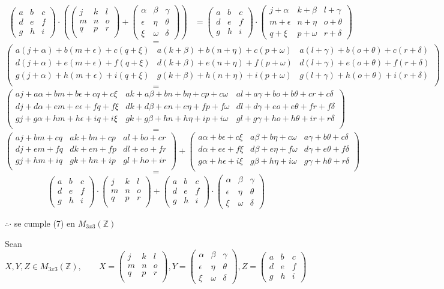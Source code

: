 \documentclass[letterpaper]{article}
\newcommand{\Nmat}{\begin{pmatrix}
		j & k & l\\
		m & n & o\\
		q & p & r\\
\end{pmatrix}}
\newcommand{\Pmat}{\begin{pmatrix}
		\alpha & \beta & \gamma\\
		\epsilon & \eta & \theta\\
		\xi & \omega & \delta
\end{pmatrix}}
\newcommand{\Mmat}{\begin{pmatrix}
		a & b & c\\
		d & e & f\\
		g & h & i
\end{pmatrix}}
\newcommand{\mtt}{M_{3x3}(\mathds{Z})}
\renewcommand{\*}{\cdot}
\theoremstyle{definition}
\begin{document}
\begin{align*}
\Mmat \* \left( \Nmat + \Pmat \right) &= \Mmat \* \begin{pmatrix}
j + \alpha & k + \beta & l + \gamma\\
m + \epsilon & n + \eta & o + \theta\\
q + \xi & p + \omega & r + \delta
\end{pmatrix} \
\end{align*} 
$$ =$$
$$
\begin{pmatrix}
a(j + \alpha) + b(m + \epsilon) + c(q + \xi) & a(k + \beta) + b(n + \eta) + c(p + \omega) & a(l + \gamma) + b(o + \theta) + c(r + \delta)\\
d(j + \alpha) + e(m + \epsilon) + f(q + \xi) & d(k + \beta) + e(n + \eta) + f(p + \omega) & d(l + \gamma) + e(o + \theta) + f(r + \delta)\\
g(j + \alpha) + h(m + \epsilon) + i(q + \xi) & g(k + \beta) + h(n + \eta) + i(p + \omega) & g(l + \gamma) + h(o + \theta) + i(r + \delta)\\
\end{pmatrix}
$$
$$ =$$
$$ 
\begin{pmatrix}
aj + a\alpha + bm + b\epsilon + cq + c\xi & ak + a\beta + bn + b\eta + cp + c\omega & al + a\gamma + bo + b\theta + cr + c\delta\\
dj + d\alpha + em + e\epsilon + fq + f\xi & dk + d\beta + en + e\eta + fp + f\omega & dl + d\gamma + eo + e\theta + fr + f\delta\\
gj + g\alpha + hm + h\epsilon + iq + i\xi & gk + g\beta + hn + h\eta + ip + i\omega & gl + g\gamma + ho + h\theta + ir + r\delta\\
\end{pmatrix}
$$ 
$$ =$$
$$
\begin{pmatrix}
aj + bm + cq  & ak + bn + cp  & al + bo + cr \\
dj + em + fq  & dk + en + fp  & dl + eo + fr \\
gj + hm + iq  & gk + hn + ip  & gl + ho + ir \\
\end{pmatrix}
+
\begin{pmatrix}
a\alpha + b\epsilon + c\xi & a\beta + b\eta + c\omega & a\gamma + b\theta + c\delta\\
d\alpha + e\epsilon + f\xi & d\beta + e\eta + f\omega & d\gamma + e\theta + f\delta\\
g\alpha + h\epsilon + i\xi & g\beta + h\eta + i\omega & g\gamma + h\theta + r\delta\\
\end{pmatrix}
$$
$$ =$$
$$
\Mmat \* \Nmat + \Mmat \* \Pmat 
$$
\begin{center}
	$ \therefore \*$ se cumple (7) en $ \mtt $
\end{center}
\newpage
Sean $ X, Y, Z \in  \mtt, \qquad X = \Nmat, Y = \Pmat, Z = \Mmat $\\
\end{document}
